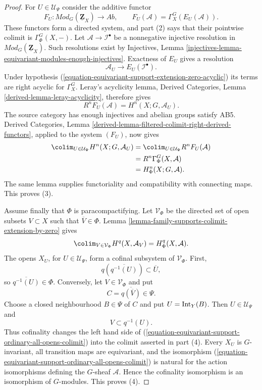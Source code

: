 \begin{proof}
For $U\in\mathcal U_\Psi$ consider the additive functor
$$
F_U:
\textit{Mod}_G(\underline{\mathbf Z}_X)\longrightarrow\textit{Ab},
\qquad
F_U(\mathcal A)=\Gamma_X^G(E_U(\mathcal A)).
$$
These functors form a directed system, and part (2) says that their
pointwise colimit is $\Gamma_\Phi^G(X,-)$. Let
$\mathcal A\to\mathcal I^\bullet$ be a nonnegative injective resolution in
$\textit{Mod}_G(\underline{\mathbf Z}_X)$. Such resolutions exist by
Injectives, Lemma
\ref{injectives-lemma-equivariant-modules-enough-injectives}.
Exactness of $E_U$ gives a resolution
$$
\mathcal A_U\longrightarrow E_U(\mathcal I^\bullet).
$$
Under hypothesis
(\ref{equation-equivariant-support-extension-zero-acyclic}) its terms are
right acyclic for $\Gamma_X^G$.
Leray's acyclicity lemma, Derived Categories, Lemma
\ref{derived-lemma-leray-acyclicity}, therefore gives
\begin{equation}
\label{equation-equivariant-support-derived-extension-zero}
R^nF_U(\mathcal A)
=
H^n(X;G,\mathcal A_U).
\end{equation}
The source category has enough injectives and abelian groups satisfy AB5.
Derived Categories, Lemma
\ref{derived-lemma-filtered-colimit-right-derived-functors}, applied to the
system $(F_U)$, now gives
$$
\begin{aligned}
\colim_{U\in\mathcal U_\Psi}H^n(X;G,\mathcal A_U)
&=\colim_{U\in\mathcal U_\Psi}R^nF_U(\mathcal A)\\
&=R^n\Gamma_\Phi^G(X,\mathcal A)\\
&=H^n_\Phi(X;G,\mathcal A).
\end{aligned}
$$
The same lemma supplies functoriality and compatibility with connecting
maps. This proves (3).

Assume finally that $\Phi$ is paracompactifying. Let $\mathcal V_\Phi$ be
the directed set of open subsets $V\subset X$ such that
$\overline V\in\Phi$. Lemma
\ref{lemma-family-supports-colimit-extension-by-zero} gives
\begin{equation}
\label{equation-equivariant-support-ordinary-all-opens-colimit}
\colim_{V\in\mathcal V_\Phi}H^q(X,\mathcal A_V)
=H^q_\Phi(X,\mathcal A).
\end{equation}
The opens $X_U$, for $U\in\mathcal U_\Psi$, form a cofinal subsystem of
$\mathcal V_\Phi$. First,
$$
q\left(\overline{q^{-1}(U)}\right)\subset\overline U,
$$
so $\overline{q^{-1}(U)}\in\Phi$. Conversely, let
$V\in\mathcal V_\Phi$ and put
$$
C=\overline{q(\overline V)}\in\Psi.
$$
Choose a closed neighbourhood $B\in\Psi$ of $C$ and put
$U=\mathop{\rm Int}_Y(B)$. Then $U\in\mathcal U_\Psi$ and
$$
V\subset q^{-1}(U).
$$
Thus cofinality changes the left hand side of
(\ref{equation-equivariant-support-ordinary-all-opens-colimit}) into the
colimit asserted in part (4).
Every $X_U$ is $G$-invariant, all transition maps are equivariant, and the
isomorphism
(\ref{equation-equivariant-support-ordinary-all-opens-colimit}) is natural
for the action isomorphisms defining the $G$-sheaf $\mathcal A$. Hence the
cofinality isomorphism is an isomorphism of $G$-modules. This proves (4).
\end{proof}


